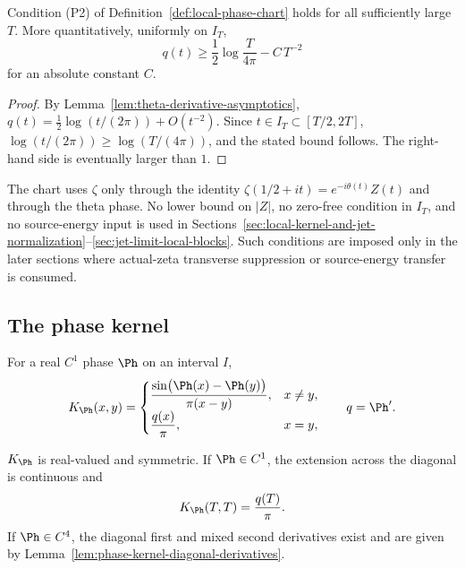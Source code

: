 \begin{lemma}
\label{lem:phase-derivative-lower-bound}
Condition \textup{(P2)} of Definition~\ref{def:local-phase-chart}
holds for all sufficiently large \(T\).  More quantitatively, uniformly
on \(I_T\),
\[
        q(t)\ge \frac12\log\frac{T}{4\pi}-C\,T^{-2}
\]
for an absolute constant \(C\).
\end{lemma}

\begin{proof}
By Lemma~\ref{lem:theta-derivative-asymptotics},
\(q(t)=\tfrac12\log(t/(2\pi))+O(t^{-2})\).  Since
\(t \in I_T \subset [T/2, 2T]\),
\(\log(t/(2\pi)) \ge \log(T/(4\pi))\), and the stated bound follows.
The right-hand side is eventually larger than \(1\).
\end{proof}

\begin{remark}
\label{rem:chart-regularity-zeta-side}
The chart uses \(\zeta\) only through the identity
\(\zeta(1/2+it)=e^{-i\theta(t)}Z(t)\) and through the theta phase.
No lower bound on \(|Z|\), no zero-free condition in \(I_T\), and no
source-energy input is used in
Sections~\ref{sec:local-kernel-and-jet-normalization}--\ref{sec:jet-limit-local-blocks}.
Such conditions are imposed only in the later sections where
actual-zeta transverse suppression or source-energy transfer is
consumed.
\end{remark}

\subsection{The phase kernel}
\label{subsec:phase-kernel}

\begin{definition}
\label{def:phase-kernel}
For a real \(C^1\) phase \(\Ph\) on an interval \(I\),
\begin{equation}
\label{eq:phase-kernel}
K_\Ph(x,y)=
\begin{cases}
\dfrac{\sin\bigl(\Ph(x)-\Ph(y)\bigr)}{\pi(x-y)}, & x\ne y,\\[1.2ex]
\dfrac{q(x)}{\pi}, & x=y,
\end{cases}
\qquad q=\Ph'.
\end{equation}
\end{definition}

\begin{lemma}
\label{lem:phase-kernel-properties}
\(K_\Ph\) is real-valued and symmetric.  If \(\Ph\in C^1\), the
extension across the diagonal is continuous and
\[
        K_\Ph(T,T)=\frac{q(T)}{\pi}.
\]
If \(\Ph\in C^4\), the diagonal first and mixed second derivatives
exist and are given by
Lemma~\ref{lem:phase-kernel-diagonal-derivatives}.
\end{lemma}

